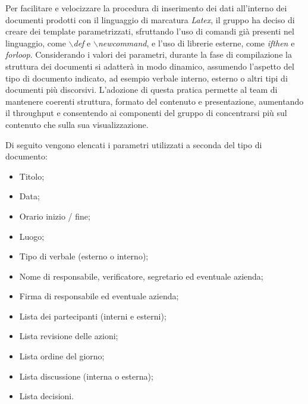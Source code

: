 \documentclass[10pt, a4paper]{article}
\begin{document}
     Per facilitare e velocizzare la procedura di inserimento dei dati all'interno dei documenti prodotti con 
    il linguaggio di marcatura \textit{Latex}, il gruppo ha deciso di creare dei template parametrizzati, sfruttando l'uso di comandi già 
    presenti nel linguaggio, come \textit{$\backslash$def} e \textit{$\backslash$newcommand}, e l'uso di librerie esterne, come 
    \textit{ifthen} e \textit{forloop}.
    Considerando i valori dei parametri, durante la fase di compilazione la struttura dei documenti si adatterà in modo dinamico, assumendo 
    l'aspetto del tipo di documento indicato, ad esempio verbale interno, esterno o altri tipi di documenti più discorsivi. L'adozione di 
    questa pratica permette al team di mantenere coerenti struttura, formato del contenuto e presentazione, aumentando il throughput e 
    consentendo ai componenti del gruppo di concentrarsi più sul contenuto che sulla sua visualizzazione.
    
    Di seguito vengono elencati i parametri utilizzati a seconda del tipo di documento:
    \begin{itemize}
        \item Titolo;
        \item Data;
        \item Orario inizio / fine;
        \item Luogo;
        \item Tipo di verbale (esterno o interno);
        \item Nome di responsabile, verificatore, segretario ed eventuale azienda;
        \item Firma di responsabile ed eventuale azienda;
        \item Lista dei partecipanti (interni e esterni);
        \item Lista revisione delle azioni;
        \item Lista ordine del giorno;
        \item Lista discussione (interna o esterna);
        \item Lista decisioni.
    \end{itemize}
    
\end{document}
